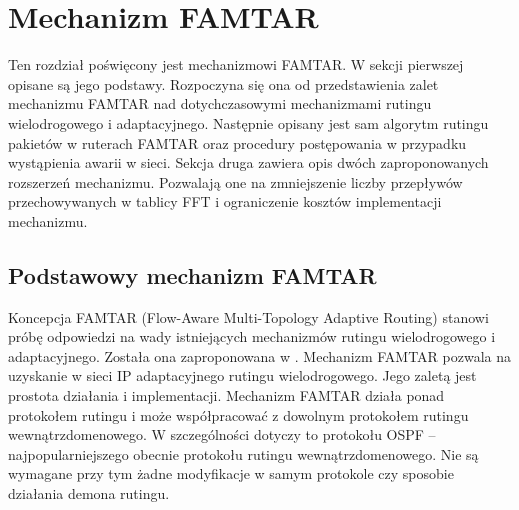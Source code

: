 \chapter{Mechanizm FAMTAR}
\label{chapter-3}

Ten rozdział poświęcony jest mechanizmowi FAMTAR. W sekcji pierwszej opisane są jego podstawy. Rozpoczyna się ona od przedstawienia zalet mechanizmu \mbox{FAMTAR} nad dotychczasowymi mechanizmami rutingu wielodrogowego i adaptacyjnego. Następnie opisany jest sam algorytm rutingu pakietów w ruterach \mbox{FAMTAR} oraz procedury postępowania w przypadku wystąpienia awarii w sieci. Sekcja druga zawiera opis dwóch zaproponowanych rozszerzeń mechanizmu. Pozwalają one na zmniejszenie liczby przepływów przechowywanych w tablicy FFT i ograniczenie kosztów implementacji mechanizmu.

\vspace{0.5cm}

\section{Podstawowy mechanizm FAMTAR}

Koncepcja FAMTAR (Flow-Aware Multi-Topology Adaptive Routing) stanowi próbę odpowiedzi na wady istniejących mechanizmów rutingu wielodrogowego i adaptacyjnego. Została ona zaproponowana w \cite{FAMTAR_LETTERS}. Mechanizm FAMTAR pozwala na uzyskanie w sieci IP adaptacyjnego rutingu wielodrogowego. Jego zaletą jest prostota działania i implementacji. Mechanizm FAMTAR działa ponad protokołem rutingu i może współpracować z dowolnym protokołem rutingu wewnątrzdomenowego. W szczególności dotyczy to protokołu OSPF -- najpopularniejszego obecnie protokołu rutingu wewnątrzdomenowego. Nie są wymagane przy tym żadne modyfikacje w samym protokole czy sposobie działania demona rutingu.

